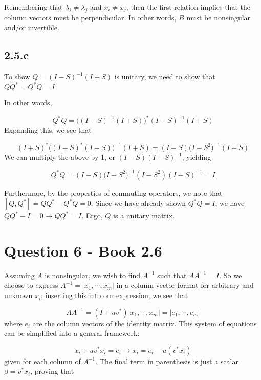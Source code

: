 \documentclass[a4paper,12pt]{article}
\begin{document}
Remembering that $\lambda_i \neq \lambda_j$ and $x_i \neq x_j$, then the first relation implies that the column vectors must be perpendicular. In other words, $B$ must be nonsingular and/or invertible. 


\subsection{2.5.c}
To show $Q=(I-S)^{-1} (I+S)$ is unitary, we need to show that $QQ^* = Q^*Q=I$


In other words,

\begin{equation}
Q^*Q = \bigg( (I-S)^{-1} (I+S) \bigg)^* (I-S)^{-1} (I+S)
\end{equation} Expanding this, we see that



\begin{equation}
(I+S)^* \bigg( (I-S)^{*} (I-S) \bigg)^{-1} (I+S) = (I-S) \bigg(   I-S^2  \bigg)^{-1} (I+S)
\end{equation} We can multiply the above by 1, or $(I-S)(I-S)^{-1}$, yielding


\begin{equation}
Q^*Q = (I-S)\bigg(   I-S^2  \bigg)^{-1} (I-S^2) (I-S)^{-1} = I
\end{equation}

Furthermore, by the properties of commuting operators, we note that $[Q,Q^*]=QQ^* -Q^*Q=0$. Since we have already shown $Q^*Q=I$, we have $QQ^*-I=0 \rightarrow QQ^*=I$.
Ergo, $Q$ is a unitary matrix.




\section{Question 6 - Book 2.6}

Assuming $A$ is nonsingular, we wish to find $A^{-1}$ such that $AA^{-1}=I$. So we choose to express $A^{-1} = |x_1, \cdots, x_m |$ in a column vector format for arbitrary and unknown $x_i$; inserting this into our expression, we see that

\begin{equation}
AA^{-1}= (I+uv^*)|x_1, \cdots, x_m| = | e_1, \cdots, e_m |
\end{equation} where $e_i$ are the column vectors of the identity matrix. This system of equations can be simplified into a general framework:

\begin{equation}
x_i + uv^* x_i = e_i \rightarrow x_i = e_i - u(v^* x_i)
\end{equation} given for each column of $A^{-1}$. The final term in parenthesis is just a scalar $\beta = v^* x_i$, proving that 
\end{document}
